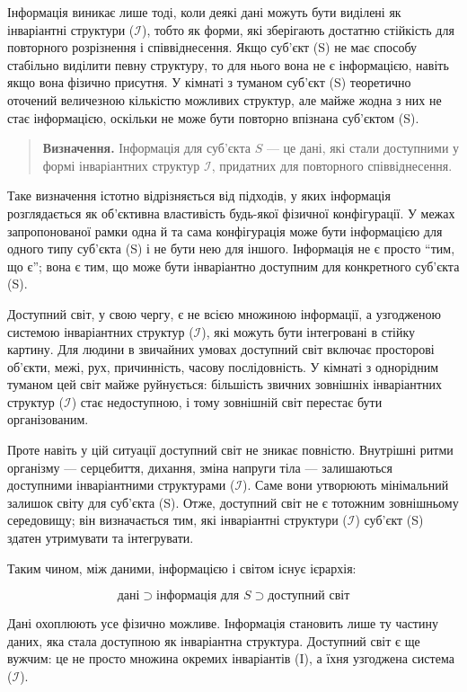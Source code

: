 \documentclass[aps,prd,onecolumn,nofootinbib,superscriptaddress]{revtex4-2}
\begin{document}
Інформація виникає лише тоді, коли деякі дані можуть бути виділені як інваріантні структури ($\mathcal{I}$), тобто як форми, які зберігають достатню стійкість для повторного розрізнення і співвіднесення. Якщо суб’єкт (S) не має способу стабільно виділити певну структуру, то для нього вона не є інформацією, навіть якщо вона фізично присутня. У кімнаті з туманом суб’єкт (S) теоретично оточений величезною кількістю можливих структур, але майже жодна з них не стає інформацією, оскільки не може бути повторно впізнана суб’єктом (S).

\begin{quote}
\textbf{Визначення.}
Інформація для суб’єкта \(S\) — це дані, які стали доступними у формі інваріантних структур \(\mathcal{I}\), придатних для повторного співвіднесення.
\end{quote}

Таке визначення істотно відрізняється від підходів, у яких інформація розглядається як об’єктивна властивість будь-якої фізичної конфігурації. У межах запропонованої рамки одна й та сама конфігурація може бути інформацією для одного типу суб’єкта (S) і не бути нею для іншого. Інформація не є просто “тим, що є”; вона є тим, що може бути інваріантно доступним для конкретного суб’єкта (S).

Доступний світ, у свою чергу, є не всією множиною інформації, а узгодженою системою інваріантних структур ($\mathcal{I}$), які можуть бути інтегровані в стійку картину. Для людини в звичайних умовах доступний світ включає просторові об’єкти, межі, рух, причинність, часову послідовність. У кімнаті з однорідним туманом цей світ майже руйнується: більшість звичних зовнішніх інваріантних структур ($\mathcal{I}$) стає недоступною, і тому зовнішній світ перестає бути організованим.

Проте навіть у цій ситуації доступний світ не зникає повністю. Внутрішні ритми організму — серцебиття, дихання, зміна напруги тіла — залишаються доступними інваріантними структурами ($\mathcal{I}$). Саме вони утворюють мінімальний залишок світу для суб’єкта (S). Отже, доступний світ не є тотожним зовнішньому середовищу; він визначається тим, які інваріантні структури ($\mathcal{I}$) суб’єкт (S) здатен утримувати та інтегрувати.

Таким чином, між даними, інформацією і світом існує ієрархія:

\[
\text{дані} \supset \text{інформація для } S \supset \text{доступний світ}
\]

Дані охоплюють усе фізично можливе. Інформація становить лише ту частину даних, яка стала доступною як інваріантна структура. Доступний світ є ще вужчим: це не просто множина окремих інваріантів (I), а їхня узгоджена система ($\mathcal{I}$).
\end{document}

